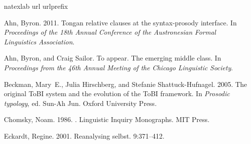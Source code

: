 \documentclass[12pt,twoside]{article}
\begin{document}
  
\cite{}
\cite{ahnsailor10,eckardt01,chomsky86a,tobi05,ahn11}

\begin{thebibliography}{5}
\expandafter\ifx\csname natexlab\endcsname\relax\def\natexlab#1{#1}\fi
\expandafter\ifx\csname url\endcsname\relax
  \def\url#1{{\tt #1}}\fi
\expandafter\ifx\csname urlprefix\endcsname\relax\def\urlprefix{URL }\fi

Ahn, Byron. 2011.
\newblock Tongan relative clauses at the syntax-prosody interface.
\newblock In {\em Proceedings of the 18th Annual Conference of the
  {A}ustronesian {F}ormal {L}inguistics {A}ssociation\/}.

Ahn, Byron, and Craig Sailor. To appear.
\newblock The emerging middle class.
\newblock In {\em Proceedings from the 46th Annual Meeting of the {C}hicago
  {L}inguistic {S}ociety\/}.

Beckman, Mary~E., Julia Hirschberg, and Stefanie Shattuck-Hufnagel. 2005.
\newblock The original {ToBI} system and the evolution of the {ToBI} framework.
\newblock In {\em Prosodic typology\/}, ed. Sun-Ah Jun. Oxford University
  Press.

Chomsky, Noam. 1986.
.
\newblock Linguistic Inquiry Monographs. MIT Press.

Eckardt, Regine. 2001.
\newblock Reanalysing selbst.
 9:371--412.

\end{thebibliography}


 
\end{document}
